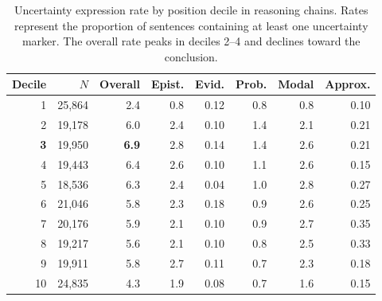\begin{table}[t]
\centering
\caption{Uncertainty expression rate by position decile in reasoning chains. Rates represent the proportion of sentences containing at least one uncertainty marker. The overall rate peaks in deciles 2--4 and declines toward the conclusion.}
\label{tab:deciles}
\small
\begin{tabular}{rrrrrrrr}
\toprule
Decile & $N$ & Overall & Epist. & Evid. & Prob. & Modal & Approx. \\
\midrule
1 & 25{,}864 & 2.4 & 0.8 & 0.12 & 0.8 & 0.8 & 0.10 \\
2 & 19{,}178 & 6.0 & 2.4 & 0.10 & 1.4 & 2.1 & 0.21 \\
\textbf{3} & 19{,}950 & \textbf{6.9} & 2.8 & 0.14 & 1.4 & 2.6 & 0.21 \\
4 & 19{,}443 & 6.4 & 2.6 & 0.10 & 1.1 & 2.6 & 0.15 \\
5 & 18{,}536 & 6.3 & 2.4 & 0.04 & 1.0 & 2.8 & 0.27 \\
6 & 21{,}046 & 5.8 & 2.3 & 0.18 & 0.9 & 2.6 & 0.25 \\
7 & 20{,}176 & 5.9 & 2.1 & 0.10 & 0.9 & 2.7 & 0.35 \\
8 & 19{,}217 & 5.6 & 2.1 & 0.10 & 0.8 & 2.5 & 0.33 \\
9 & 19{,}911 & 5.8 & 2.7 & 0.11 & 0.7 & 2.3 & 0.18 \\
10 & 24{,}835 & 4.3 & 1.9 & 0.08 & 0.7 & 1.6 & 0.15 \\
\bottomrule
\end{tabular}
\end{table}